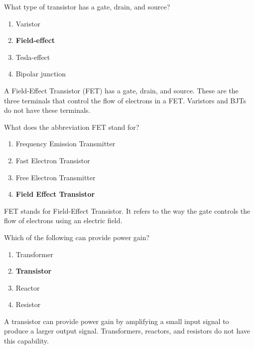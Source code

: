 \begin{tcolorbox}[colback=gray!10!white,colframe=black!75!black,title={T6B05}]
    What type of transistor has a gate, drain, and source?
    \begin{enumerate}[label=\Alph*),noitemsep]
        \item Varistor
        \item \textbf{Field-effect}
        \item Tesla-effect
        \item Bipolar junction
    \end{enumerate}
\end{tcolorbox}
A Field-Effect Transistor (FET) has a gate, drain, and source. These are the three terminals that control the flow of electrons in a FET. Varistors and BJTs do not have these terminals.

\begin{tcolorbox}[colback=gray!10!white,colframe=black!75!black,title={T6B08}]
    What does the abbreviation FET stand for?
    \begin{enumerate}[label=\Alph*),noitemsep]
        \item Frequency Emission Transmitter
        \item Fast Electron Transistor
        \item Free Electron Transmitter
        \item \textbf{Field Effect Transistor}
    \end{enumerate}
\end{tcolorbox}
FET stands for Field-Effect Transistor. It refers to the way the gate controls the flow of electrons using an electric field.

\begin{tcolorbox}[colback=gray!10!white,colframe=black!75!black,title={T6B10}]
    Which of the following can provide power gain?
    \begin{enumerate}[label=\Alph*),noitemsep]
        \item Transformer
        \item \textbf{Transistor}
        \item Reactor
        \item Resistor
    \end{enumerate}
\end{tcolorbox}
A transistor can provide power gain by amplifying a small input signal to produce a larger output signal. Transformers, reactors, and resistors do not have this capability.

